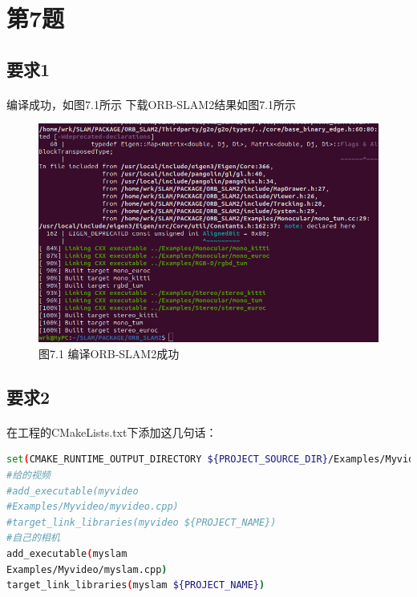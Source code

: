 \documentclass[40pt,a4paper，UTF8]{ctexart}
\begin{document}
\paragraph{}

\section{第7题}
\subsection{要求1} 
\paragraph{}
编译成功，如图7.1所示
下载ORB-SLAM2结果如图7.1所示
\begin{figure}[H]
\centering
\includegraphics[width=4.8in]{ch1_7_1.png} {图7.1 编译ORB-SLAM2成功}
\end{figure}

\paragraph{}

\subsection{要求2} 
\paragraph{}
在工程的CMakeLists.txt下添加这几句话：

\begin{lstlisting}[language=bash, caption=修改的工程/CMakeLists.txt]
set(CMAKE_RUNTIME_OUTPUT_DIRECTORY ${PROJECT_SOURCE_DIR}/Examples/Myvideo)
#给的视频
#add_executable(myvideo	
#Examples/Myvideo/myvideo.cpp)
#target_link_libraries(myvideo ${PROJECT_NAME})	
#自己的相机
add_executable(myslam	
Examples/Myvideo/myslam.cpp)
target_link_libraries(myslam ${PROJECT_NAME})
\end{lstlisting}
\end{document}
